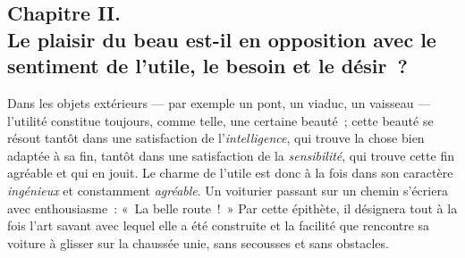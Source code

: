 \documentclass[french,twoside]{book} %
\begin{document}
\subsection[{Chapitre II. Le plaisir du beau est-il en opposition avec le sentiment de l’utile, le besoin et le désir ?}]{Chapitre II. \\
Le plaisir du beau est-il en opposition avec le sentiment de l’utile, le besoin et le désir ?}
\noindent  Dans les objets extérieurs — par exemple un pont, un viaduc, un vaisseau — l’utilité constitue toujours, comme telle, une certaine beauté ; cette beauté se résout tantôt dans une satisfaction de l’\emph{intelligence}, qui trouve la chose bien adaptée à sa fin, tantôt dans une satisfaction de la \emph{sensibilité}, qui trouve cette fin agréable et qui en jouit. Le charme de l’utile est donc à la fois dans son caractère \emph{ingénieux} et constamment \emph{agréable}. Un voiturier passant sur un chemin s’écriera avec enthousiasme : « La belle route ! » Par cette épithète, il désignera tout à la fois l’art savant avec lequel elle a été construite et la facilité que rencontre sa voiture à glisser sur la chaussée unie, sans secousses et sans obstacles.\par
\end{document}
